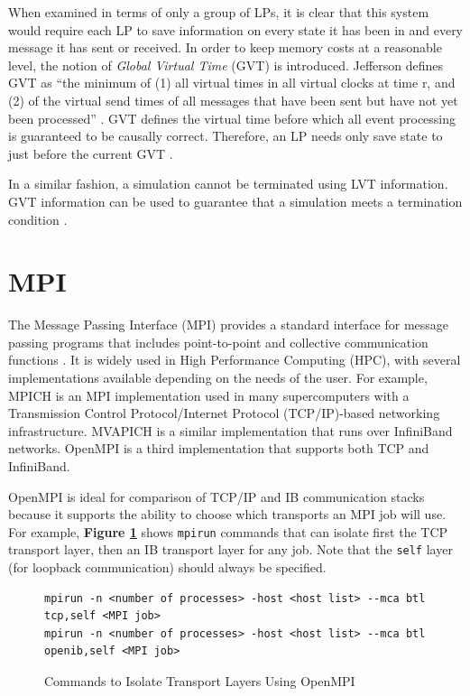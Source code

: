 \documentclass[11pt]{book}
\begin{document}
When examined in terms of only a group of LPs, it is clear that this system would
require each LP to save information on every state it has been in and every
message it has sent or received. In order to keep memory costs at a reasonable
level, the notion of \textit{Global Virtual Time} (GVT) is introduced. Jefferson defines
GVT as ``the minimum of (1) all virtual times in all virtual clocks at time r,
and (2) of the virtual send times of all messages that have been sent but have
not yet been processed'' \cite{jefferson-85}. GVT defines the virtual time
before which all event processing is guaranteed to be causally
correct. Therefore, an LP needs only save state to just before the current GVT
\cite{fujimoto-89b}.

In a similar fashion, a simulation cannot be terminated using LVT
information. GVT information can be used to guarantee that a simulation meets a
termination condition \cite{jefferson-85}.

\section{\textbf{MPI}}

The Message Passing Interface (MPI) provides a standard interface for message
passing programs that includes point-to-point and collective communication
functions \cite{mpi-12}. It is widely used in High Performance Computing (HPC),
with several implementations available depending on the needs of the user. For
example, MPICH \cite{mpich} is an MPI implementation used in many supercomputers
with a Transmission Control Protocol/Internet Protocol (TCP/IP)-based networking
infrastructure. MVAPICH \cite{mvapich} is a similar implementation that runs
over InfiniBand networks. OpenMPI \cite{openmpi} is a third implementation that
supports both TCP and InfiniBand.

OpenMPI is ideal for comparison of TCP/IP and IB communication stacks because it
supports the ability to choose which transports an MPI job will use. For
example, \textbf{Figure \ref{ompi-btl}} shows \verb;mpirun; commands that can
isolate first the TCP transport layer, then an IB transport layer for any
job. Note that the \verb;self; layer (for loopback communication) should always
be specified.

\begin{figure}
\centering
\begin{verbatim}
mpirun -n <number of processes> -host <host list> --mca btl tcp,self <MPI job>
mpirun -n <number of processes> -host <host list> --mca btl openib,self <MPI job>
\end{verbatim}
\caption{Commands to Isolate Transport Layers Using OpenMPI}
\label{ompi-btl}
\end{figure}
\end{document}
